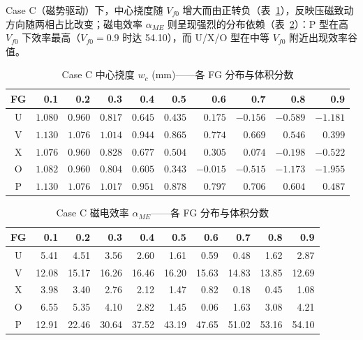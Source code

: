 \documentclass[11pt,a4paper]{ctexart}
\begin{document}
Case C（磁势驱动）下，中心挠度随 $V_{f0}$ 增大而由正转负（表~\ref{tab:magneto-results}），反映压磁致动方向随两相占比改变；磁电效率 $\alpha_{ME}$ 则呈现强烈的分布依赖（表~\ref{tab:me-efficiency}）：P 型在高 $V_{f0}$ 下效率最高（$V_{f0}=0.9$ 时达 54.10），而 U/X/O 型在中等 $V_{f0}$ 附近出现效率谷值。

\begin{table}[H]
\centering
\caption{Case C 中心挠度 $w_c$ (mm)——各 FG 分布与体积分数}
\label{tab:magneto-results}
\small
\begin{tabular}{c*{9}{r}}
\toprule
\textbf{FG} & \textbf{0.1} & \textbf{0.2} & \textbf{0.3} & \textbf{0.4} & \textbf{0.5} & \textbf{0.6} & \textbf{0.7} & \textbf{0.8} & \textbf{0.9} \\
\midrule
U & $1.080$ & $0.960$ & $0.817$ & $0.645$ & $0.435$ & $0.175$ & $-0.156$ & $-0.589$ & $-1.181$ \\
V & $1.130$ & $1.076$ & $1.014$ & $0.944$ & $0.865$ & $0.774$ & $0.669$ & $0.546$ & $0.399$ \\
X & $1.076$ & $0.960$ & $0.828$ & $0.677$ & $0.504$ & $0.305$ & $0.074$ & $-0.198$ & $-0.522$ \\
O & $1.082$ & $0.960$ & $0.804$ & $0.605$ & $0.343$ & $-0.015$ & $-0.515$ & $-1.173$ & $-1.955$ \\
P & $1.130$ & $1.076$ & $1.017$ & $0.951$ & $0.878$ & $0.797$ & $0.706$ & $0.604$ & $0.487$ \\
\bottomrule
\end{tabular}
\end{table}

\begin{table}[H]
\centering
\caption{Case C 磁电效率 $\alpha_{ME}$——各 FG 分布与体积分数}
\label{tab:me-efficiency}
\small
\begin{tabular}{c*{9}{r}}
\toprule
\textbf{FG} & \textbf{0.1} & \textbf{0.2} & \textbf{0.3} & \textbf{0.4} & \textbf{0.5} & \textbf{0.6} & \textbf{0.7} & \textbf{0.8} & \textbf{0.9} \\
\midrule
U & 5.41 & 4.51 & 3.56 & 2.60 & 1.61 & 0.59 & 0.48 & 1.62 & 2.87 \\
V & 12.08 & 15.17 & 16.26 & 16.46 & 16.20 & 15.63 & 14.83 & 13.85 & 12.69 \\
X & 3.98 & 3.40 & 2.76 & 2.12 & 1.47 & 0.82 & 0.18 & 0.45 & 1.08 \\
O & 6.55 & 5.35 & 4.10 & 2.82 & 1.45 & 0.06 & 1.63 & 3.08 & 4.21 \\
P & 12.91 & 22.46 & 30.64 & 37.52 & 43.19 & 47.65 & 51.02 & 53.16 & 54.10 \\
\bottomrule
\end{tabular}
\end{table}
\end{document}
